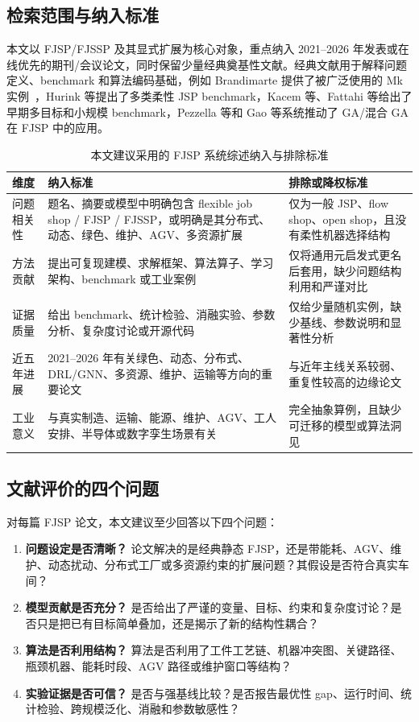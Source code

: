 \documentclass[UTF8,a4paper,11pt]{ctexart}
\begin{document}
\subsection{检索范围与纳入标准}

本文以 FJSP/FJSSP 及其显式扩展为核心对象，重点纳入 2021--2026 年发表或在线优先的期刊/会议论文，同时保留少量经典奠基性文献。经典文献用于解释问题定义、benchmark 和算法编码基础，例如 Brandimarte 提供了被广泛使用的 Mk 实例~\cite{Brandimarte1993}，Hurink 等提出了多类柔性 JSP benchmark\cite{Hurink1994}，Kacem 等、Fattahi 等给出了早期多目标和小规模 benchmark\cite{Kacem2002,Fattahi2007}，Pezzella 等和 Gao 等系统推动了 GA/混合 GA 在 FJSP 中的应用\cite{Pezzella2008,Gao2008}。

\begin{table}[H]
\centering
\caption{本文建议采用的 FJSP 系统综述纳入与排除标准}
\label{tab:protocol}
\begin{tabularx}{\textwidth}{p{3.2cm}Y Y}
\toprule
维度 & 纳入标准 & 排除或降权标准 \\
\midrule
问题相关性 & 题名、摘要或模型中明确包含 flexible job shop / FJSP / FJSSP，或明确是其分布式、动态、绿色、维护、AGV、多资源扩展 & 仅为一般 JSP、flow shop、open shop，且没有柔性机器选择结构 \\
方法贡献 & 提出可复现建模、求解框架、算法算子、学习架构、benchmark 或工业案例 & 仅将通用元启发式更名后套用，缺少问题结构利用和严谨对比 \\
证据质量 & 给出 benchmark、统计检验、消融实验、参数分析、复杂度讨论或开源代码 & 仅给少量随机实例，缺少基线、参数说明和显著性分析 \\
近五年进展 & 2021--2026 年有关绿色、动态、分布式、DRL/GNN、多资源、维护、运输等方向的重要论文 & 与近年主线关系较弱、重复性较高的边缘论文 \\
工业意义 & 与真实制造、运输、能源、维护、AGV、工人安排、半导体或数字孪生场景有关 & 完全抽象算例，且缺少可迁移的模型或算法洞见 \\
\bottomrule
\end{tabularx}
\end{table}

\subsection{文献评价的四个问题}

对每篇 FJSP 论文，本文建议至少回答以下四个问题：
\begin{enumerate}
    \item \textbf{问题设定是否清晰？} 论文解决的是经典静态 FJSP，还是带能耗、AGV、维护、动态扰动、分布式工厂或多资源约束的扩展问题？其假设是否符合真实车间？
    \item \textbf{模型贡献是否充分？} 是否给出了严谨的变量、目标、约束和复杂度讨论？是否只是把已有目标简单叠加，还是揭示了新的结构性耦合？
    \item \textbf{算法是否利用结构？} 算法是否利用了工件工艺链、机器冲突图、关键路径、瓶颈机器、能耗时段、AGV 路径或维护窗口等结构？
    \item \textbf{实验证据是否可信？} 是否与强基线比较？是否报告最优性 gap、运行时间、统计检验、跨规模泛化、消融和参数敏感性？
\end{enumerate}
\end{document}
